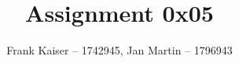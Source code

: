 \documentclass{article}
\begin{document}
\title{Assignment 0x05}
\author{Frank Kaiser -- 1742945, Jan Martin -- 1796943}

\maketitle

\tableofcontents



\end{document}
